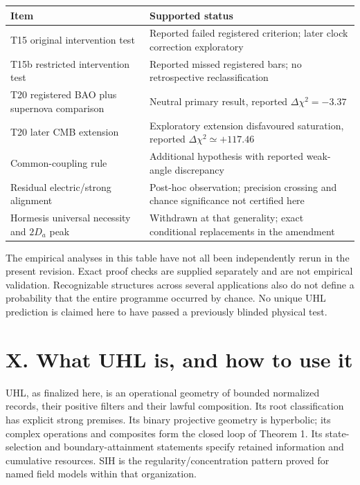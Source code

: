 \documentclass[
  11pt,
  a4paper,
]{article}
\newcounter{none} %
\begin{document}
{\def\LTcaptype{none} %
\begin{longtable}[]{@{}
  >{\raggedright\arraybackslash}p{}
  >{\raggedright\arraybackslash}p{}@{}}
\toprule\noalign{}
\begin{minipage}[b]{\linewidth}\raggedright
Item
\end{minipage} & \begin{minipage}[b]{\linewidth}\raggedright
Supported status
\end{minipage} \\
\midrule\noalign{}
\endhead
\bottomrule\noalign{}
\endlastfoot
T15 original intervention test & Reported failed registered criterion; later clock correction exploratory \\
T15b restricted intervention test & Reported missed registered bars; no retrospective reclassification \\
T20 registered BAO plus supernova comparison & Neutral primary result, reported \(\Delta\chi^2=-3.37\) \\
T20 later CMB extension & Exploratory extension disfavoured saturation, reported \(\Delta\chi^2\simeq+117.46\) \\
Common-coupling rule & Additional hypothesis with reported weak-angle discrepancy \\
Residual electric/strong alignment & Post-hoc observation; precision crossing and chance significance not certified here \\
Hormesis universal necessity and \(2D_a\) peak & Withdrawn at that generality; exact conditional replacements in the amendment \\
\end{longtable}
}

The empirical analyses in this table have not all been independently rerun in the present revision. Exact proof checks are supplied separately and are not empirical validation. Recognizable structures across several applications also do not define a probability that the entire programme occurred by chance. No unique UHL prediction is claimed here to have passed a previously blinded physical test.

\section{X. What UHL is, and how to use it}\label{x.-what-uhl-is-and-how-to-use-it}

UHL, as finalized here, is an operational geometry of bounded normalized records, their positive filters and their lawful composition. Its root classification has explicit strong premises. Its binary projective geometry is hyperbolic; its complex operations and composites form the closed loop of Theorem 1. Its state-selection and boundary-attainment statements specify retained information and cumulative resources. SIH is the regularity/concentration pattern proved for named field models within that organization.
\end{document}
